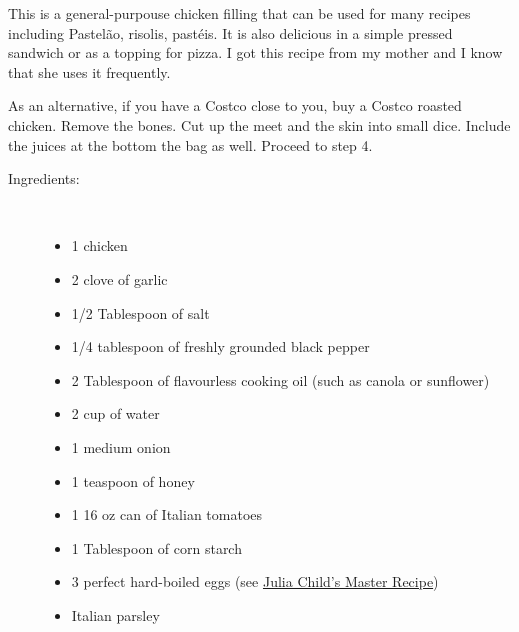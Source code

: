 \documentclass[11pt,letterpaper]{article}
\begin{document}


This is a general-purpouse chicken filling that can be used for many recipes including Pastel\~ao, risolis, past\'eis. It is also delicious in a simple pressed sandwich or as a topping for pizza. I got this recipe from my mother and I know that she uses it frequently. 

As an alternative, if you have a Costco close to you, buy a Costco roasted chicken. Remove the bones. Cut up the meet and the skin into small dice. Include the juices at the bottom the bag as well. Proceed to step 4.
 
\begin{description}

\item[Ingredients:]\ \\
	\begin{itemize}
	\item 1 chicken
	\item 2 clove of garlic
	\item 1/2 Tablespoon of salt
	\item 1/4 tablespoon of freshly grounded black pepper
        \item 2 Tablespoon of flavourless cooking oil (such as canola or sunflower)
        \item 2 cup of water
        \item 1 medium onion
        \item 1 teaspoon of honey
	\item 1 16 oz can of Italian tomatoes
	\item 1 Tablespoon of corn starch
	\item 3 perfect hard-boiled eggs (see \href{HardBoiledEggs.html}{Julia Child's Master Recipe})
        \item Italian parsley
	\end{itemize}


\end{description}
\end{document}
